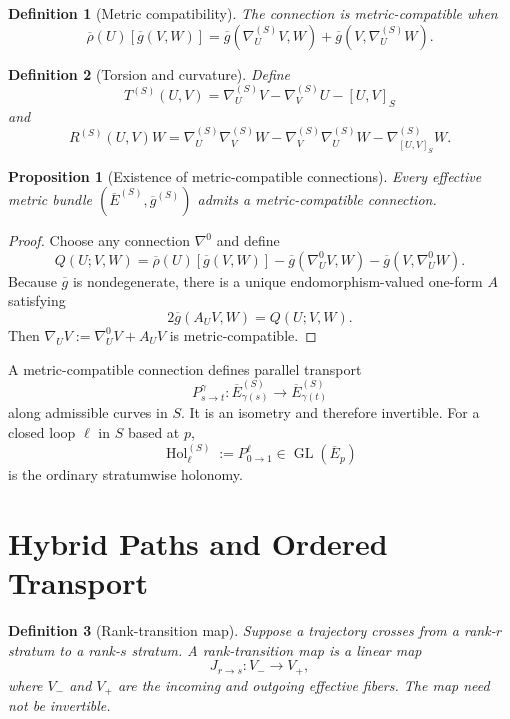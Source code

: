 \documentclass[11pt]{article}
\newtheorem{definition}{Definition}[section]
\newtheorem{proposition}{Proposition}[section]
\newcommand{\Hol}{\operatorname{Hol}}
\newcommand{\GL}{\operatorname{GL}}
\begin{document}
\begin{definition}[Metric compatibility]
The connection is metric-compatible when
\[
\overline\rho(U)[\overline g(V,W)]
=\overline g(\nabla^{(S)}_UV,W)
+\overline g(V,\nabla^{(S)}_UW).
\]
\end{definition}

\begin{definition}[Torsion and curvature]
Define
\[
T^{(S)}(U,V)=\nabla^{(S)}_UV-\nabla^{(S)}_VU-[U,V]_S
\]
and
\[
R^{(S)}(U,V)W
=\nabla^{(S)}_U\nabla^{(S)}_VW
-\nabla^{(S)}_V\nabla^{(S)}_UW
-\nabla^{(S)}_{[U,V]_S}W.
\]
\end{definition}

\begin{proposition}[Existence of metric-compatible connections]
Every effective metric bundle $(\overline E^{(S)},\overline g^{(S)})$ admits a
metric-compatible connection.
\end{proposition}

\begin{proof}
Choose any connection $\nabla^0$ and define
\[
Q(U;V,W)=\overline\rho(U)[\overline g(V,W)]
-\overline g(\nabla^0_UV,W)-\overline g(V,\nabla^0_UW).
\]
Because $\overline g$ is nondegenerate, there is a unique endomorphism-valued
one-form $A$ satisfying
\[
2\overline g(A_UV,W)=Q(U;V,W).
\]
Then $\nabla_UV:=\nabla^0_UV+A_UV$ is metric-compatible.
\end{proof}

A metric-compatible connection defines parallel transport
\[
P^\gamma_{s\to t}:\overline E^{(S)}_{\gamma(s)}
\to\overline E^{(S)}_{\gamma(t)}
\]
along admissible curves in $S$. It is an isometry and therefore invertible.
For a closed loop $\ell$ in $S$ based at $p$,
\[
\Hol^{(S)}_\ell:=P^\ell_{0\to1}\in\GL(\overline E_p)
\]
is the ordinary stratumwise holonomy.

\section{Hybrid Paths and Ordered Transport}
\label{sec:hybrid}

\begin{definition}[Rank-transition map]
Suppose a trajectory crosses from a rank-$r$ stratum to a rank-$s$ stratum.
A rank-transition map is a linear map
\[
J_{r\to s}:V_-\to V_+,
\]
where $V_-$ and $V_+$ are the incoming and outgoing effective fibers. The map
need not be invertible.
\end{definition}
\end{document}
